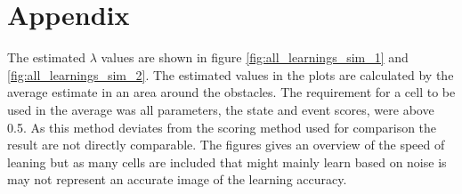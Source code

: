 \chapter{Appendix}
\label{appendix:learning_curves}
The estimated $\lambda$ values are shown in figure \ref{fig:all_learnings_sim_1} and \ref{fig:all_learnings_sim_2}. The estimated values in the plots are calculated by the average estimate in an area around the obstacles. The requirement for a cell to be used in the average was all parameters, the state and event scores, were above 0.5. As this method deviates from the scoring method used for comparison the result are not directly comparable.
The figures gives an overview of the speed of leaning but as many cells are included that might mainly learn based on noise is may not represent an accurate image of the learning accuracy.


